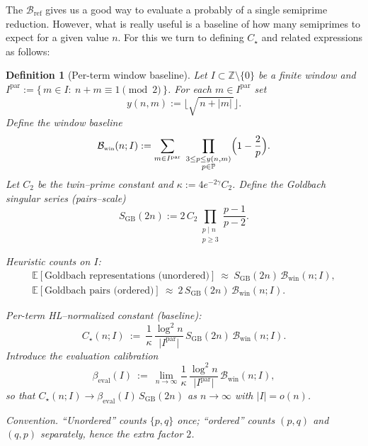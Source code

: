 \documentclass[11pt]{article}
\theoremstyle{inline}
\theoremstyle{break}
\theoremstyle{break}
\theoremstyle{break}
\theoremstyle{break}
\theoremstyle{break}
\newtheorem{definition}{Definition}
\theoremstyle{inline}
\newcommand{\twin}{{\scriptscriptstyle\mathrm{win}}}
\newcommand{\tref}{{\scriptscriptstyle\mathrm{ref}}}
\newcommand{\Bwin}{\mathcal{B}_\twin}
\newcommand{\Bref}{\mathcal{B}_\tref}
\newcommand{\betacal}{\beta_{\mathrm{eval}}}
\begin{document}
The \( \Bref \) gives us a good way to evaluate a probably of a single semiprime reduction.  However, what is really useful is a baseline of how many semiprimes to expect for a given value \( n \).  For this we turn to defining \( C_\star \) and related expressions as follows:

\begin{definition}[Per-term window baseline]\label{def:window-baseline}
Let \(I\subset\mathbb Z\setminus\{0\}\) be a finite window and
\(I^{\mathrm{par}}:=\{\,m\in I:\ n+m\equiv 1 \pmod 2\,\}\).
For each \(m\in I^{\mathrm{par}}\) set
\begin{equation}
y(n,m):=\bigl\lfloor\sqrt{\,n+|m|\,}\bigr\rfloor.
\end{equation}
Define the \emph{window baseline}
\begin{equation}
\Bwin(n;I):=\sum_{m\in I^{\mathrm{par}}}\ \prod_{\substack{3\le p\le y(n,m)\\ p\in\mathbb P}}
\Bigl(1-\frac{2}{p}\Bigr).
\end{equation}
Let \(C_2\) be the twin–prime constant and \(\kappa:=4e^{-2\gamma}C_2\).\cite{HardyLittlewood1923, MontgomeryVaughan2007}
Define the Goldbach singular series (pairs–scale)
\begin{equation}
S_{\mathrm{GB}}(2n):=2\,C_2\!\!\prod_{\substack{p\mid n\\ p\ge 3}}\frac{p-1}{p-2}.
\end{equation}

\emph{Heuristic counts on \(I\):}
\begin{equation}
\begin{aligned}
\mathbb{E}[\text{Goldbach representations (unordered)}]\ \approx\ S_{\mathrm{GB}}(2n)\,\Bwin(n;I), \\
\mathbb{E}[\text{Goldbach pairs (ordered)}]\ \approx\ 2\,S_{\mathrm{GB}}(2n)\,\Bwin(n;I).
\end{aligned}
\end{equation}

\emph{Per-term HL–normalized constant (baseline):}
\begin{equation}
C_\star(n;I)
\ :=\
\frac{1}{\kappa}\,\frac{\log^2 n}{\lvert I^{\mathrm{par}}\rvert}\,
S_{\mathrm{GB}}(2n)\,\Bwin(n;I).
\end{equation}
Introduce the evaluation calibration
\begin{equation}
\betacal(I)\ :=\ \lim_{n\to\infty}\frac{1}{\kappa}\,\frac{\log^2 n}{\lvert I^{\mathrm{par}}\rvert}\,\Bwin(n;I),
\end{equation}
so that \(C_\star(n;I)\to \betacal(I)\,S_{\mathrm{GB}}(2n)\) as \(n\to\infty\) with \(\lvert I\rvert=o(n)\).

\noindent\emph{Convention.} “Unordered” counts \(\{p,q\}\) once; “ordered” counts \((p,q)\) and \((q,p)\) separately, hence the extra factor \(2\).
\end{definition}
\end{document}
